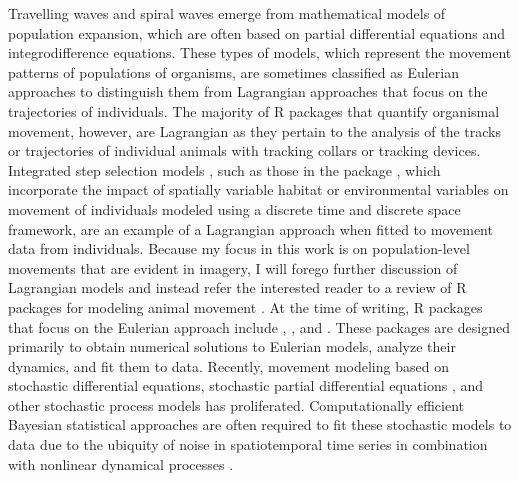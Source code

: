 Travelling waves and spiral waves emerge from mathematical models of
population expansion, which are often based on partial differential
equations and integrodifference equations. These types of models, which
represent the movement patterns of populations of organisms, are
sometimes classified as Eulerian approaches to distinguish them from
Lagrangian approaches that focus on the trajectories of individuals. The
majority of R packages that quantify organismal movement, however, are
Lagrangian as they pertain to the analysis of the tracks or trajectories
of individual animals with tracking collars or tracking devices.
Integrated step selection models \citep{Avgar}, such as those in the
 package \citep{amt}, which incorporate the impact of
spatially variable habitat or environmental variables on movement of
individuals modeled using a discrete time and discrete space framework,
are an example of a Lagrangian approach when fitted to movement data
from individuals. Because my focus in this work is on population-level
movements that are evident in imagery, I will forego further discussion
of Lagrangian models and instead refer the interested reader to a review
of R packages for modeling animal movement \citep{Joo}. At the time of
writing, R packages that focus on the Eulerian approach include
 \citep{IDE},  \citep{deSolve}, and
 \citep{ReacTran}. These packages are designed
primarily to obtain numerical solutions to Eulerian models, analyze
their dynamics, and fit them to data. Recently, movement modeling based
on stochastic differential equations, stochastic partial differential
equations \citep{Krainski}, and other stochastic process models
\citep{Buderman} has proliferated. Computationally efficient Bayesian
statistical approaches are often required to fit these stochastic models
to data due to the ubiquity of noise in spatiotemporal time series in
combination with nonlinear dynamical processes \citep{Krainski}.

